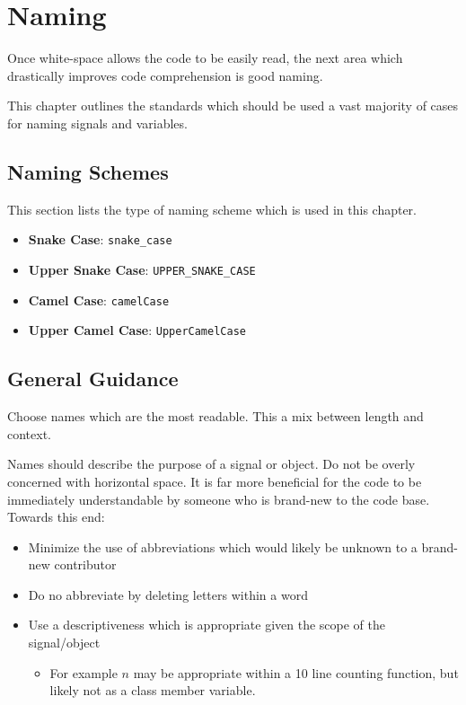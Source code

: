 \chapter{Naming}

  Once white-space allows the code to be easily read, the next area which drastically improves code comprehension is good naming.

  This chapter outlines the standards which should be used a vast majority of cases for naming signals and variables.

  \section{Naming Schemes}
    This section lists the type of naming scheme which is used in this chapter.

    \begin{itemize}
      \item \textbf{Snake Case}: \verb+snake_case+
      \item \textbf{Upper Snake Case}: \verb+UPPER_SNAKE_CASE+
      \item \textbf{Camel Case}: \verb+camelCase+
      \item \textbf{Upper Camel Case}: \verb+UpperCamelCase+
    \end{itemize}

  \section{General Guidance}
    Choose names which are the most readable.
    This a mix between length and context.

    Names should describe the purpose of a signal or object.
    Do not be overly concerned with horizontal space.
    It is far more beneficial for the code to be immediately understandable by someone who is brand-new to the code base.
    Towards this end:
    \begin{itemize}
      \item Minimize the use of abbreviations which would likely be unknown to a brand-new contributor
      \item Do no abbreviate by deleting letters within a word
      \item Use a descriptiveness which is appropriate given the scope of the signal/object
      \begin{itemize}
        \item For example $n$ may be appropriate within a 10 line counting function, but likely not as a class member variable.
      \end{itemize}
    \end{itemize}

